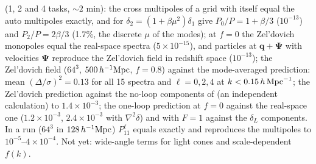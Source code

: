 \begin{validation}
 (1, 2 and 4 tasks, $\sim2$ min): the cross multipoles of a grid with itself equal the auto
multipoles exactly, and for $\delta_2=(1+\beta\mu^2)\delta_1$ give $P_0/P=1+\beta/3$ ($10^{-13}$) and $P_2/P=2\beta/3$ (1.7\%, the discrete
$\mu$ of the modes); at $f=0$ the Zel'dovich monopoles equal the real-space spectra ($5\times10^{-15}$), and particles at
$\bm q+\bm\Psi$ with velocities $\bm\Psi$ reproduce the Zel'dovich field in redshift space ($10^{-13}$); the Zel'dovich field
($64^3$, $500\,h^{-1}\mathrm{Mpc}$, $f=0.8$) against the mode-averaged prediction: mean $(\Delta/\sigma)^2=0.13$ for all 15 spectra and
$\ell=0,2,4$ at $k<0.15\,h\,\mathrm{Mpc}^{-1}$; the Zel'dovich prediction against the no-loop components of  (an independent
calculation) to $1.4\times10^{-3}$; the one-loop prediction at $f=0$ against the real-space one ($1.2\times10^{-3}$, $2.4\times10^{-3}$
with $\nabla^2\delta$) and with $F=1$ against the $\delta_L$ components. In a  run ($64^3$ in $128\,h^{-1}\mathrm{Mpc}$)
$P^\ell_{11}$ equals  exactly and  reproduces the multipoles to $10^{-5}$--$4\times10^{-4}$.
Not yet: wide-angle terms for light cones and scale-dependent $f(k)$.
\end{validation}
